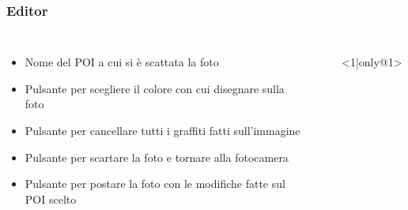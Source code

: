 \documentclass{beamer}
\begin{document}
\begin{frame}
\frametitle{Editor}
\begin{columns}
\begin{itemize}
 	\item <2-> Nome del POI a cui si \`e scattata la foto
 	\item <3-> Pulsante per scegliere il colore con cui disegnare sulla foto 
 	\item <5-> Pulsante per cancellare tutti i graffiti fatti sull'immagine
 	\item <6-> Pulsante per scartare la foto e tornare alla fotocamera
 	\item <7-> Pulsante per postare la foto con le modifiche fatte sul POI scelto
\end{itemize}


\begin{itemize}
	\item[] <1|only@1> 
		\begin{figure}[!h]
 			\centering

\end{figure}
\end{itemize}
\end{columns}
\end{frame}
\end{document}

